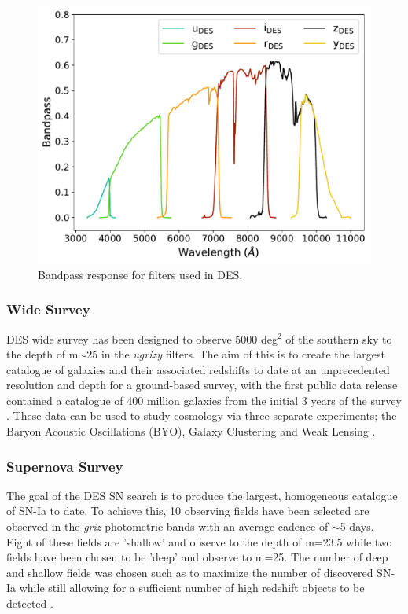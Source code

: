 \begin{figure}
  \centering
  \includegraphics[width=\textwidth]{Figures/Chapter2/DES_filters}
    \caption{Bandpass response for filters used in DES.}
    \label{fig:DESFilters}
\end{figure}

\subsubsection{Wide Survey}
DES wide survey has been designed to observe 5000 deg$^2$ of the southern sky to the depth of m$\sim$25 in the \textit{ugrizy} filters. The aim of this is to create the largest catalogue of galaxies and their associated redshifts to date at an unprecedented resolution and depth for a ground-based survey, with the first public data release contained a catalogue of 400 million galaxies from the initial 3 years of the survey \citep{DES2018}. These data can be used to study cosmology via three separate experiments; the Baryon Acoustic Oscillations (BYO), Galaxy Clustering and Weak Lensing \citep{DES2016,Prat2017,Drlica-Wagner2017,DES2017}.

\subsubsection{Supernova Survey}
The goal of the DES SN search is to produce the largest, homogeneous catalogue of SN-Ia to date. To achieve this, 10 observing fields have been selected are observed in the \textit{griz} photometric bands with an average cadence of $\sim$5 days. Eight of these fields are 'shallow' and observe to the depth of m=23.5 while two fields have been chosen to be 'deep' and observe to m=25. The number of deep and shallow fields was chosen such as to maximize the number of discovered SN-Ia while still allowing for a sufficient number of high redshift objects to be detected \citep{Bernstein2012}.

